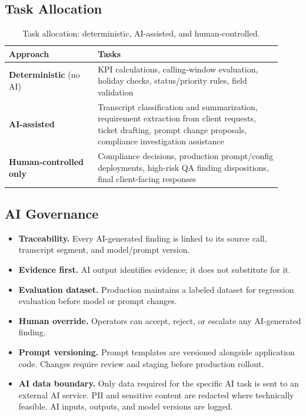 \documentclass[11pt,a4paper]{article}
\begin{document}
\subsection{Task Allocation}

\begin{table}[H]
\centering
\small
\begin{tabular}{p{0.30\linewidth}p{0.62\linewidth}}
\toprule
\textbf{Approach} & \textbf{Tasks} \\
\midrule
\textbf{Deterministic} (no AI) &
  KPI calculations, calling-window evaluation, holiday checks, status/priority rules, field validation \\[4pt]
\textbf{AI-assisted} &
  Transcript classification and summarization, requirement extraction from client requests, ticket drafting, prompt change proposals, compliance investigation assistance \\[4pt]
\textbf{Human-controlled only} &
  Compliance decisions, production prompt/config deployments, high-risk QA finding dispositions, final client-facing responses \\
\bottomrule
\end{tabular}
\caption{Task allocation: deterministic, AI-assisted, and human-controlled.}
\end{table}

\subsection{AI Governance}

\begin{itemize}
  \item \textbf{Traceability.} Every AI-generated finding is linked to its source call, transcript segment, and model/prompt version.
  \item \textbf{Evidence first.} AI output identifies evidence; it does not substitute for it.
  \item \textbf{Evaluation dataset.} Production maintains a labeled dataset for regression evaluation before model or prompt changes.
  \item \textbf{Human override.} Operators can accept, reject, or escalate any AI-generated finding.
  \item \textbf{Prompt versioning.} Prompt templates are versioned alongside application code. Changes require review and staging before production rollout.
  \item \textbf{AI data boundary.} Only data required for the specific AI task is sent to an external AI service. PII and sensitive content are redacted where technically feasible. AI inputs, outputs, and model versions are logged.
\end{itemize}
\end{document}
